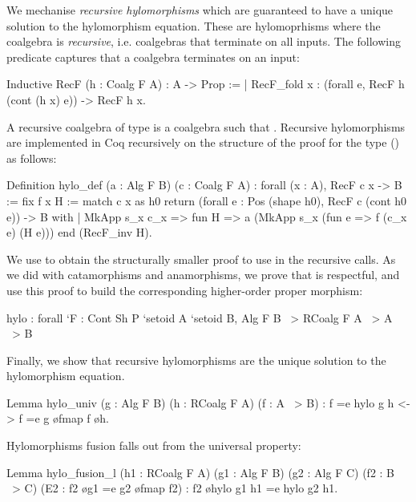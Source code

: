 \documentclass{llncs}
\begin{document}
We mechanise \emph{recursive
hylomorphisms} which are guaranteed to have a unique solution to the
hylomorphism equation. These are hylomoprhisms where the coalgebra is
\emph{recursive}, i.e. coalgebras that terminate on all inputs. The following
predicate captures that a coalgebra terminates on an input:
\begin{coqcode}
Inductive RecF (h : Coalg F A) : A -> Prop :=
| RecF_fold x : (forall e, RecF h (cont (h x) e)) -> RecF h x.
\end{coqcode}
A recursive coalgebra of type  is a coalgebra
 such that .
Recursive hylomorphisms are implemented in Coq recursively on the structure of
the proof for the type () as follows:
\begin{coqcode}
Definition hylo_def (a : Alg F B) (c : Coalg F A)
  : forall (x : A), RecF c x -> B := fix f x H
  := match c x as h0 return (forall e : Pos (shape h0), RecF c (cont h0 e)) -> B
     with | MkApp s_x c_x => fun H => a (MkApp s_x (fun e => f (c_x e) (H e)))
     end (RecF_inv H).
\end{coqcode}
We use  to obtain the structurally smaller proof to use in
the recursive calls. As we did with catamorphisms and anamorphisms, we
prove that  is respectful, and use this proof to build the
corresponding higher-order proper morphism:
\begin{coqcode}
  hylo : forall `{F : Cont Sh P} `{setoid A} `{setoid B},
    Alg F B ~> RCoalg F A ~> A ~> B
\end{coqcode}
Finally, we show that recursive hylomorphisms are the unique solution to the
hylomorphism equation.
\begin{coqcode}
Lemma hylo_univ (g : Alg F B) (h : RCoalg F A) (f : A ~> B)
    : f =e hylo g h <-> f =e g \o fmap f \o h.
\end{coqcode}
Hylomorphisms fusion falls out from the universal property:
\begin{coqcode}
Lemma hylo_fusion_l (h1 : RCoalg F A) (g1 : Alg F B) (g2 : Alg F C)
  (f2 : B ~> C) (E2 : f2 \o g1 =e g2 \o fmap f2) : f2 \o hylo g1 h1 =e hylo g2 h1.
\end{coqcode}

\end{document}
